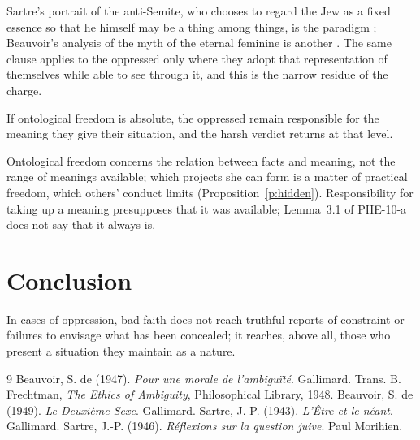 \documentclass{situationist-preprint}
\begin{document}
Sartre's portrait of the anti-Semite, who chooses to regard the Jew as a fixed essence so that he himself may be a thing among things, is the paradigm \citep{Sartre1946}; Beauvoir's analysis of the myth of the eternal feminine is another \citep{Beauvoir1949}. The same clause applies to the oppressed only where they adopt that representation of themselves while able to see through it, and this is the narrow residue of the charge.

\begin{objection}
If ontological freedom is absolute, the oppressed remain responsible for the meaning they give their situation, and the harsh verdict returns at that level.
\end{objection}

\begin{reply}
Ontological freedom concerns the relation between facts and meaning, not the range of meanings available; which projects she can form is a matter of practical freedom, which others' conduct limits (Proposition~\ref{p:hidden}). Responsibility for taking up a meaning presupposes that it was available; Lemma~3.1 of PHE-10-a does not say that it always is.
\end{reply}

\section{Conclusion}

In cases of oppression, bad faith does not reach truthful reports of constraint or failures to envisage what has been concealed; it reaches, above all, those who present a situation they maintain as a nature.

\begin{thebibliography}{9}\small
{} Beauvoir, S. de (1947). \emph{Pour une morale de l'ambigu\"it\'e}. Gallimard. Trans. B. Frechtman, \emph{The Ethics of Ambiguity}, Philosophical Library, 1948.
 Beauvoir, S. de (1949). \emph{Le Deuxi\`eme Sexe}. Gallimard.
 Sartre, J.-P. (1943). \emph{L'\^Etre et le n\'eant}. Gallimard.
 Sartre, J.-P. (1946). \emph{R\'eflexions sur la question juive}. Paul Morihien.
\end{thebibliography}
\end{document}
